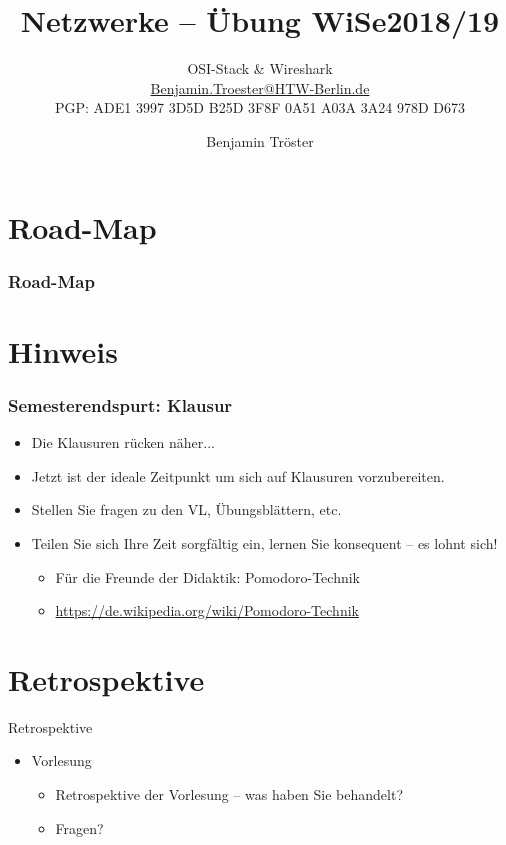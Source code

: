\documentclass[xcolor=dvipsnames, aspectratio=169]{beamer}
\begin{document}

\title{Netzwerke -- Übung WiSe2018/19}
\subtitle{OSI-Stack \& Wireshark\\
		\href{mailto:Benjamin.Troester@HTW-Berlin.de}{Benjamin.Troester@HTW-Berlin.de}\\
		PGP: ADE1 3997 3D5D B25D 3F8F 0A51 A03A 3A24 978D D673 }
\author{Benjamin Tröster}

\date{}

\begin{frame}
\titlepage

\end{frame}

\section*{Road-Map}
\begin{frame}
\frametitle{Road-Map}
\begin{multicols}{2}
  \tableofcontents
\end{multicols}
\end{frame}

\section{Hinweis}
\begin{frame}
	\frametitle{Semesterendspurt: Klausur}
	\begin{itemize}
		\item Die Klausuren rücken näher...
		\item Jetzt ist der ideale Zeitpunkt um sich auf Klausuren vorzubereiten.
		\item Stellen Sie fragen zu den VL, Übungsblättern, etc. 
		\item Teilen Sie sich Ihre Zeit sorgfältig ein, lernen Sie konsequent -- es lohnt sich!
		\begin{itemize}
			\item Für die Freunde der Didaktik: Pomodoro-Technik
			\item \url{https://de.wikipedia.org/wiki/Pomodoro-Technik}
		\end{itemize}
	\end{itemize}
\end{frame}

\section{Retrospektive}
\begin{frame}{Retrospektive}
\begin{itemize}
	\item Vorlesung
	\begin{itemize}
		\item Retrospektive der Vorlesung -- was haben Sie behandelt?
		\item Fragen?
	\end{itemize}
\end{itemize}
\end{frame}
\end{document}
